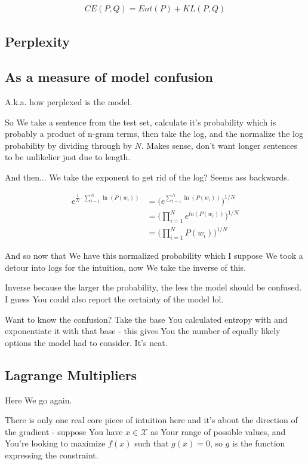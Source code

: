 \documentclass{article}
\begin{document}
		\begin{align}
			CE(P, Q) = Ent(P) + KL(P, Q)
		\end{align}
		
	\subsection{Perplexity}
	
		\subsection{As a measure of model confusion}
		
			A.k.a. how perplexed is the model.
			
			So We take a sentence from the test set, calculate it's probability which is probably a product of n-gram terms, then take the log, and the normalize the log probability by dividing through by $N$. Makes sense, don't want longer sentences to be unlikelier just due to length.
			
			And then... We take the exponent to get rid of the log? Seems ass backwards.
			
			\begin{align}
				e^{\frac{1}{N}\cdot\sum^N_{i=1}\ln(P(w_i))} &= \big(e^{\sum^N_{i=1}\ln(P(w_i))}\big)^{1/N}\\
				&= \bigg(\prod^N_{i=1} e^{ln(P(w_i))}\bigg)^{1/N}\\
				&= \bigg(\prod^N_{i=1} P(w_i)\bigg)^{1/N}
			\end{align}
			
			And so now that We have this normalized probability which I suppose We took a detour into logs for the intuition, now We take the inverse of this.
			
			Inverse because the larger the probability, the less the model should be confused. I guess You could also report the certainty of the model lol.
			
			Want to know the confusion? Take the base You calculated entropy with and exponentiate it with that base - this gives You the number of equally likely options the model had to consider. It's neat.
			
			
	\subsection{Lagrange Multipliers}
	
		Here We go again.
		
		There is only one real core piece of intuition here and it's about the direction of the gradient - suppose You have $x\in\mathcal{X}$ as Your range of possible values, and You're looking to maximize $f(x)$ such that $g(x) = 0$, so $g$ is the function expressing the constraint.
		
\end{document}

